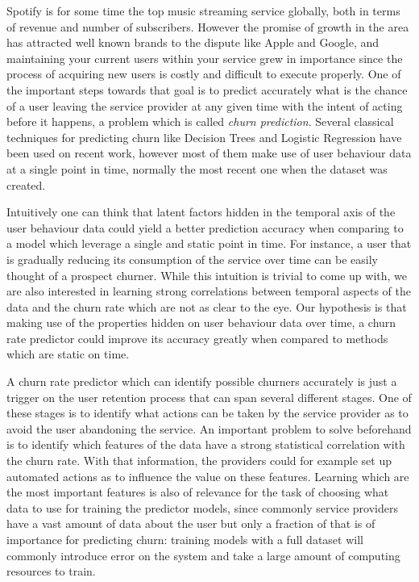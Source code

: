 \documentclass{kththesis}
\begin{document}
	Spotify is for some time the top music streaming service globally, both in terms of revenue and number of subscribers.	However the promise of growth in the area has attracted well known brands to the dispute like Apple and Google, and maintaining your current users within your service grew in importance since the process of acquiring new users is costly and difficult to execute properly. One of the important steps towards that goal is to predict accurately what is the chance of a user leaving the service provider at any given time with the intent of acting before it happens, a problem which is called \emph{churn prediction}. Several classical techniques for predicting churn like Decision Trees and Logistic Regression have been used on recent work, however most of them make use of user behaviour data at a single point in time, normally the most recent one when the dataset was created. 
    
    Intuitively one can think that latent factors hidden in the temporal axis of the user behaviour data could yield a better prediction accuracy when comparing to a model which leverage a single and static point in time. For instance, a user that is gradually reducing its consumption of the service over time can be easily thought of a prospect churner. While this intuition is trivial to come up with, we are also interested in learning strong correlations between temporal aspects of the data and the churn rate which are not as clear to the eye. Our hypothesis is that making use of the properties hidden on user behaviour data over time, a churn rate predictor could improve its accuracy greatly when compared to methods which are static on time.
    
A churn rate predictor which can identify possible churners accurately is just a trigger on the user retention process that can span several different stages. One of these stages is to identify what actions can be taken by the service provider as to avoid the user abandoning the service. An important problem to solve beforehand is to identify which features of the data have a strong statistical correlation with the churn rate. With that information, the providers could for example set up automated actions as to influence the value on these features. Learning which are the most important features is also of relevance for the task of choosing what data to use for training the predictor models, since commonly service providers have a vast amount of data about the user but only a fraction of that is of importance for predicting churn: training models with a full dataset will commonly introduce error on the system and take a large amount of computing resources to train.
	
\end{document}
